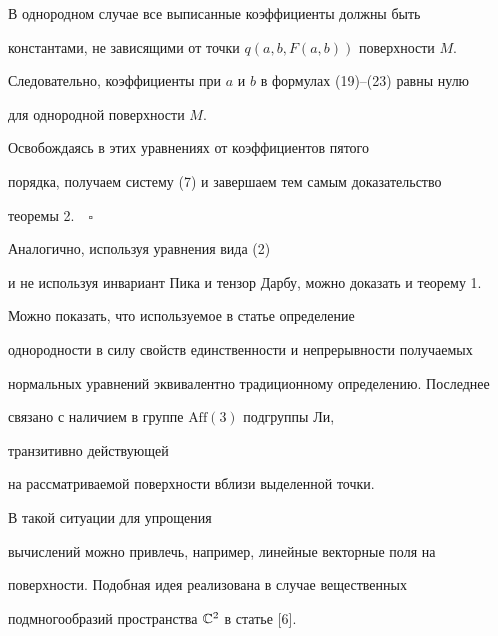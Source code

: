 В однородном случае все выписанные коэффициенты должны быть


константами, не зависящими от точки $q(a,b, F(a,b))$ поверхности $M$.


Следовательно, коэффициенты при $a$ и $b$ в формулах (19)--(23) равны нулю


для однородной поверхности $M$.





Освобождаясь в этих уравнениях от коэффициентов пятого


порядка, получаем систему (7) и завершаем тем самым доказательство


теоремы 2.$\quad\square$





\begin{note}


Аналогично, используя уравнения вида (2)


и не используя инвариант Пика и тензор Дарбу, можно доказать и теорему 1.


\end{note}





\begin{note}


Можно показать, что используемое в статье определение


однородности в силу свойств единственности и непрерывности получаемых


нормальных уравнений эквивалентно традиционному определению. Последнее


связано с наличием в группе $\text{Aff}(3)$ подгруппы Ли,


транзитивно действующей


на рассматриваемой поверхности вблизи выделенной точки.


\end{note}





В такой ситуации для упрощения


вычислений можно привлечь, например, линейные векторные поля на


поверхности. Подобная идея реализована в случае вещественных


подмногообразий пространства $\Bbb C^2$ в статье [6].





